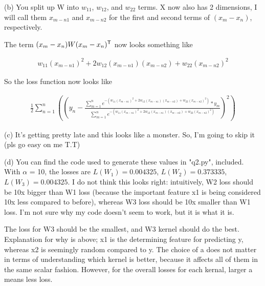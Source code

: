 \documentclass[submit]{harvardml}
\begin{document}
\bigskip \noindent (b) You split up W into $w_{11}$, $w_{12}$, and $w_{22}$ terms. X now also has 2 dimensions, I will call them $x_{m-n1}$ and $x_{m-n2}$ for the first and second terms of $(x_m - x_n)$, respectively. 

\bigskip \noindent The term $(x_m - x_n)W(x_m - x_n)^{\mathsf{T}}$ now looks something like

\begin{align*}
    w_{11}(x_{m-n1})^2 + 2w_{12}(x_{m-n1})(x_{m-n2}) + w_{22}(x_{m-n2})^2
\end{align*}

\bigskip \noindent So the loss function now looks like

\begin{align*}
    \frac{1}{2}\sum_{n=1}^n ((y_n - \frac{\sum_{m=1}^n e^{- (w_{11}(x_{m-n1})^2 + 2w_{12}(x_{m-n1})(x_{m-n2}) + w_{22}(x_{m-n2})^2)} *y_m}{\sum_{m=1}^n e^{{-(w_{11}(x_{m-n1})^2 + 2w_{12}(x_{m-n1})(x_{m-n2}) + w_{22}(x_{m-n2})^2)}}})^{2})
\end{align*}

\bigskip \noindent (c) It's getting pretty late and this looks like a monster. So, I'm going to skip it (pls go easy on me T.T)

\bigskip \noindent (d) You can find the code used to generate these values in "q2.py", included. With $\alpha$ = 10, the losses are $L(W_1) = 0.004325$, $L(W_2) = 0.373335$, $L(W_3) = 0.004325$. I do not think this looks right: intuitively, W2 loss should be 10x bigger than W1 loss (because the important feature x1 is being considered 10x less compared to before), whereas W3 loss should be 10x smaller than W1 loss. I'm not sure why my code doesn't seem to work, but it is what it is.

\bigskip \noindent The loss for W3 should be the smallest, and W3 kernel should do the best. Explanation for why is above; x1 is the determining feature for predicting y, whereas x2 is seemingly random compared to y. The choice of a does not matter in terms of understanding which kernel is better, because it affects all of them in the same scalar fashion. However, for the overall losses for each kernal, larger a means less loss. 

\pagebreak
\end{document}
